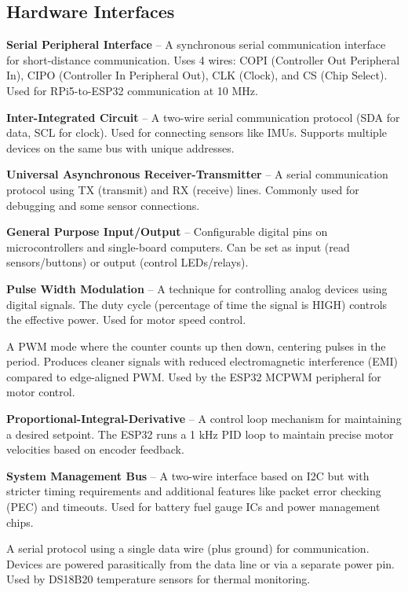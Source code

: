 \subsection{Hardware Interfaces}

\begin{description}[style=nextline, leftmargin=2cm]
    \item[SPI] \textbf{Serial Peripheral Interface} -- A synchronous serial communication interface for short-distance communication. Uses 4 wires: COPI (Controller Out Peripheral In), CIPO (Controller In Peripheral Out), CLK (Clock), and CS (Chip Select). Used for RPi5-to-ESP32 communication at 10 MHz.

    \item[I2C] \textbf{Inter-Integrated Circuit} -- A two-wire serial communication protocol (SDA for data, SCL for clock). Used for connecting sensors like IMUs. Supports multiple devices on the same bus with unique addresses.

    \item[UART] \textbf{Universal Asynchronous Receiver-Transmitter} -- A serial communication protocol using TX (transmit) and RX (receive) lines. Commonly used for debugging and some sensor connections.

    \item[GPIO] \textbf{General Purpose Input/Output} -- Configurable digital pins on microcontrollers and single-board computers. Can be set as input (read sensors/buttons) or output (control LEDs/relays).

    \item[PWM] \textbf{Pulse Width Modulation} -- A technique for controlling analog devices using digital signals. The duty cycle (percentage of time the signal is HIGH) controls the effective power. Used for motor speed control.

    \item[Center-Aligned PWM] A PWM mode where the counter counts up then down, centering pulses in the period. Produces cleaner signals with reduced electromagnetic interference (EMI) compared to edge-aligned PWM. Used by the ESP32 MCPWM peripheral for motor control.

    \item[PID] \textbf{Proportional-Integral-Derivative} -- A control loop mechanism for maintaining a desired setpoint. The ESP32 runs a 1 kHz PID loop to maintain precise motor velocities based on encoder feedback.

    \item[SMBus] \textbf{System Management Bus} -- A two-wire interface based on I2C but with stricter timing requirements and additional features like packet error checking (PEC) and timeouts. Used for battery fuel gauge ICs and power management chips.

    \item[1-Wire] A serial protocol using a single data wire (plus ground) for communication. Devices are powered parasitically from the data line or via a separate power pin. Used by DS18B20 temperature sensors for thermal monitoring.
\end{description}

